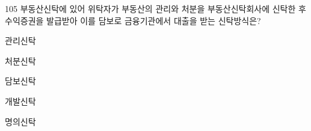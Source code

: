 \begin{question}{105}
부동산신탁에 있어 위탁자가 부동산의 관리와 처분을 부동산신탁회사에 신탁한 후 수익증권을 발급받아 이를 담보로 금융기관에서 대출을 받는 신탁방식은?
\begin{choices}
  \item 관리신탁
  \item 처분신탁
  \item 담보신탁
  \item 개발신탁
  \item 명의신탁
\end{choices}
\end{question}
